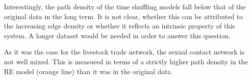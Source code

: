 Interestingly, the path density of the time shuffling models fall below that of the original data in the long term.
It is not clear, whether this can be attributed to the increasing edge density or whether it reflects an intrinsic property of this system.
A longer dataset would be needed in order to answer this question. 

As it was the case for the livestock trade network, the sexual contact network is not well mixed.
This is measured in terms of a strictly higher path density in the RE model (orange line) than it was in the original data.



